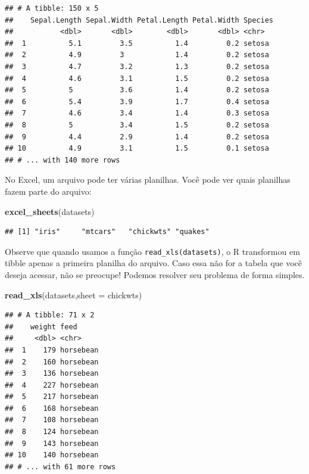 \documentclass[
]{book}
\newenvironment{Shaded}{\begin{snugshade}}{\end{snugshade}}
\newcommand{\DataTypeTok}[1]{\textcolor[rgb]{0.13,0.29,0.53}{#1}}
\newcommand{\KeywordTok}[1]{\textcolor[rgb]{0.13,0.29,0.53}{\textbf{#1}}}
\newcommand{\NormalTok}[1]{#1}
\newcommand{\StringTok}[1]{\textcolor[rgb]{0.31,0.60,0.02}{#1}}
\begin{document}
\begin{verbatim}
## # A tibble: 150 x 5
##    Sepal.Length Sepal.Width Petal.Length Petal.Width Species
##           <dbl>       <dbl>        <dbl>       <dbl> <chr>  
##  1          5.1         3.5          1.4         0.2 setosa 
##  2          4.9         3            1.4         0.2 setosa 
##  3          4.7         3.2          1.3         0.2 setosa 
##  4          4.6         3.1          1.5         0.2 setosa 
##  5          5           3.6          1.4         0.2 setosa 
##  6          5.4         3.9          1.7         0.4 setosa 
##  7          4.6         3.4          1.4         0.3 setosa 
##  8          5           3.4          1.5         0.2 setosa 
##  9          4.4         2.9          1.4         0.2 setosa 
## 10          4.9         3.1          1.5         0.1 setosa 
## # ... with 140 more rows
\end{verbatim}

No Excel, um arquivo pode ter várias planilhas. Você pode ver quais planilhas fazem parte do arquivo:

\begin{Shaded}
\begin{Highlighting}[]
\KeywordTok{excel\_sheets}\NormalTok{(datasets)}
\end{Highlighting}
\end{Shaded}

\begin{verbatim}
## [1] "iris"     "mtcars"   "chickwts" "quakes"
\end{verbatim}

Observe que quando usamos a função \texttt{read\_xls(datasets)}, o R transformou em tibble apenas a primeira planilha do arquivo. Caso essa não for a tabela que você deseja acessar, não se preocupe! Podemos resolver seu problema de forma simples.

\begin{Shaded}
\begin{Highlighting}[]
\KeywordTok{read\_xls}\NormalTok{(datasets,}\DataTypeTok{sheet =} \StringTok{\textquotesingle{}chickwts\textquotesingle{}}\NormalTok{)}
\end{Highlighting}
\end{Shaded}

\begin{verbatim}
## # A tibble: 71 x 2
##    weight feed     
##     <dbl> <chr>    
##  1    179 horsebean
##  2    160 horsebean
##  3    136 horsebean
##  4    227 horsebean
##  5    217 horsebean
##  6    168 horsebean
##  7    108 horsebean
##  8    124 horsebean
##  9    143 horsebean
## 10    140 horsebean
## # ... with 61 more rows
\end{verbatim}
\end{document}

